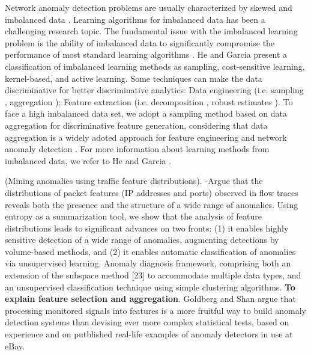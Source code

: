 \documentclass[review]{elsarticle}
\begin{document}
Network anomaly detection problems are usually characterized by skewed and imbalanced data \cite{Phua2004minority,he2008learning,benson2010network}. Learning algorithms for imbalanced data has been a challenging research topic. The fundamental issue with the imbalanced learning problem is the ability of imbalanced data to significantly compromise the performance of most standard learning algorithms \cite{he2008learning}. He and Garcia \cite{he2008learning} present a classification of imbalanced learning methods as sampling, cost-sensitive learning, kernel-based, and active learning. Some techniques can make the data discriminative for better discriminative analytics: Data engineering (i.e. sampling \cite{he2008learning,gu2008botminer}, aggregation \cite{lakhina2005mining,gu2008botminer,callegari2011novel, garcia2014empirical, acarali2016survey}); Feature extraction (i.e. decomposition \cite{vaswani2018robust}, robust estimates \cite{zhou2017anomaly}). To face a high imbalanced data set, we adopt a sampling method based on data aggregation for discriminative feature generation, considering that data aggregation is a widely adoted approach for feature engineering \cite{garcia2014empirical, chandrashekar2014survey,acarali2016survey} and network anomaly detection \cite{lakhina2005mining, callegari2011novel, vieira2017model}. For more information about learning methods from imbalanced data, we refer to He and Garcia \cite{he2008learning}.

\cite{lakhina2005mining} (Mining anomalies using traffic feature distributions).  -Argue that the distributions of packet features (IP addresses and ports) observed in flow traces reveals both the presence and the structure of a wide range of anomalies. Using entropy as a summarization tool, we show that the analysis of feature distributions leads to significant advances on two fronts: (1) it enables highly sensitive detection of a wide range of anomalies, augmenting detections by volume-based methods, and (2) it enables automatic classification of anomalies via unsupervised learning. Anomaly diagnosis framework, comprising both an extension of the subspace method [23] to accommodate multiple data types, and an unsupervised classification technique using simple clustering algorithms. \textbf{To explain feature selection and aggregation}. Goldberg and Shan \cite{goldberg2015importance} argue that processing monitored signals into features is a more fruitful way to build anomaly detection systems than devising ever more complex statistical tests, based on experience and  on putblished real-life examples of anomaly detectors in use at eBay. 
\end{document}
